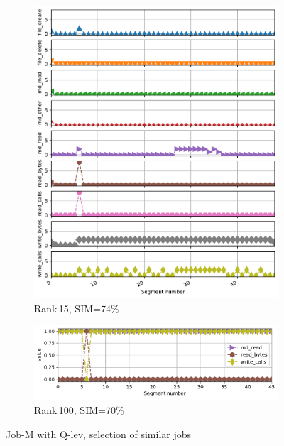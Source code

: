 \documentclass{jhps}
\begin{document}
\begin{figure}[bt]
\begin{subfigure}{0.3\textwidth}
\includegraphics[width=\textwidth]{job_similarities_5024292-out/hex_lev-0.7392--15timeseries7651420}
\caption{Rank\,15, SIM=74\%}
\end{subfigure}

\vspace*{-1.7cm}
\begin{subfigure}{0.3\textwidth}
\centering
\includegraphics[width=\textwidth]{job_similarities_5024292-out/hex_lev-0.7007--99timeseries8201967}
\caption{Rank\,100, SIM=70\%}
\end{subfigure}

\caption{Job-M with Q-lev, selection of similar jobs}%
\label{fig:job-M-hex-lev}
\end{figure}
\end{document}
